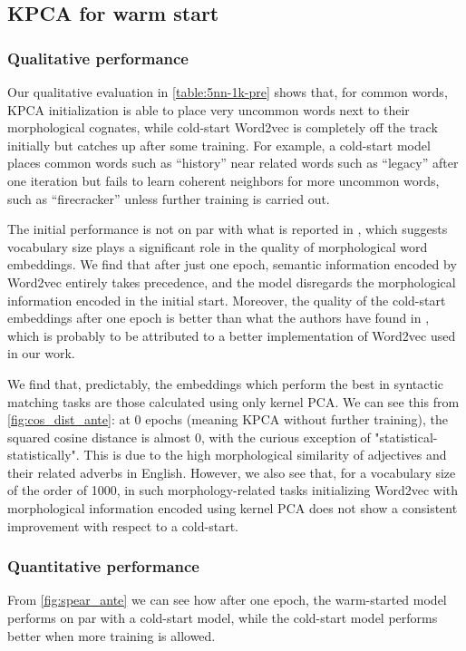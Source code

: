 \subsection{KPCA for warm start}

\subsubsection{Qualitative performance}
Our qualitative evaluation in \cref{table:5nn-1k-pre} shows that, for common words, KPCA initialization is able to place very uncommon words next to their morphological cognates, while cold-start Word2vec is completely off the track initially but catches up after some training. For example, a cold-start model places common words such as ``history'' near related words such as ``legacy'' after one iteration but fails to learn coherent neighbors for more uncommon words, such as ``firecracker'' unless further training is carried out.

The initial performance is not on par with what is reported in \cite{gupta_improving_2019}, which suggests vocabulary size plays a significant role in the quality of morphological word embeddings. We find that after just one epoch, semantic information encoded by Word2vec entirely takes precedence, and the model disregards the morphological information encoded in the initial start. Moreover, the quality of the cold-start embeddings after one epoch is better than what the authors have found in \cite{gupta_improving_2019}, which is probably to be attributed to a better implementation of Word2vec used in our work.

We find that, predictably, the embeddings which perform the best in syntactic matching tasks are those calculated using only kernel PCA. We can see this from \cref{fig:cos_dist_ante}: at 0 epochs (meaning KPCA without further training), the squared cosine distance is almost 0, with the curious exception of "statistical-statistically". 
This is due to the high morphological similarity of adjectives and their related adverbs in English.
However, we also see that, for a vocabulary size of the order of 1000, in such morphology-related tasks initializing Word2vec with morphological information encoded using kernel PCA does not show a consistent improvement with respect to a cold-start. 

\subsubsection{Quantitative performance}
From \cref{fig:spear_ante} we can see how after one epoch, the warm-started model performs on par with a cold-start model, while the cold-start model performs better when more training is allowed. 

